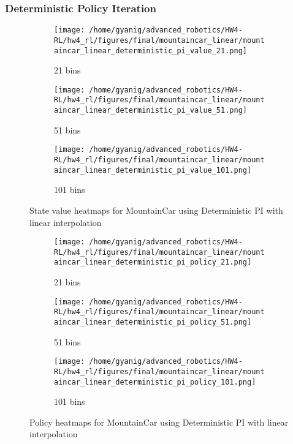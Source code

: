 \documentclass{article}
\begin{document}
\subsubsection{Deterministic Policy Iteration}
\begin{figure}[H]
    \centering
    \begin{subfigure}{0.32\textwidth}
        \texttt{[image: /home/gyanig/advanced\_robotics/HW4-RL/hw4\_rl/figures/final/mountaincar\_linear/mountaincar\_linear\_deterministic\_pi\_value\_21.png]}
        \caption{21 bins}
    \end{subfigure}
    \begin{subfigure}{0.32\textwidth}
        \texttt{[image: /home/gyanig/advanced\_robotics/HW4-RL/hw4\_rl/figures/final/mountaincar\_linear/mountaincar\_linear\_deterministic\_pi\_value\_51.png]}
        \caption{51 bins}
    \end{subfigure}
    \begin{subfigure}{0.32\textwidth}
        \texttt{[image: /home/gyanig/advanced\_robotics/HW4-RL/hw4\_rl/figures/final/mountaincar\_linear/mountaincar\_linear\_deterministic\_pi\_value\_101.png]}
        \caption{101 bins}
    \end{subfigure}
    \caption{State value heatmaps for MountainCar using Deterministic PI with linear interpolation}
\end{figure}

\begin{figure}[H]
    \centering
    \begin{subfigure}{0.32\textwidth}
        \texttt{[image: /home/gyanig/advanced\_robotics/HW4-RL/hw4\_rl/figures/final/mountaincar\_linear/mountaincar\_linear\_deterministic\_pi\_policy\_21.png]}
        \caption{21 bins}
    \end{subfigure}
    \begin{subfigure}{0.32\textwidth}
        \texttt{[image: /home/gyanig/advanced\_robotics/HW4-RL/hw4\_rl/figures/final/mountaincar\_linear/mountaincar\_linear\_deterministic\_pi\_policy\_51.png]}
        \caption{51 bins}
    \end{subfigure}
    \begin{subfigure}{0.32\textwidth}
        \texttt{[image: /home/gyanig/advanced\_robotics/HW4-RL/hw4\_rl/figures/final/mountaincar\_linear/mountaincar\_linear\_deterministic\_pi\_policy\_101.png]}
        \caption{101 bins}
    \end{subfigure}
    \caption{Policy heatmaps for MountainCar using Deterministic PI with linear interpolation}
\end{figure}
\end{document}
